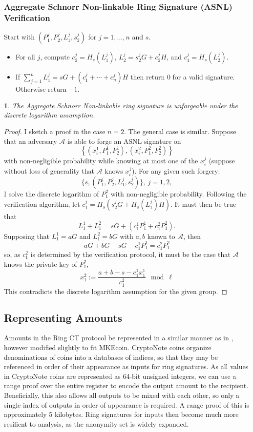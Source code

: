 \documentclass[12pt,oneside,english]{amsart}
\numberwithin{equation}{section}
\numberwithin{figure}{section}
\theoremstyle{plain}
\newtheorem{thm}{\protect\theoremname}
\theoremstyle{plain}
\theoremstyle{remark}
\theoremstyle{plain}
\theoremstyle{remark}
\theoremstyle{remark}
\theoremstyle{plain}
\theoremstyle{definition}
\providecommand{\theoremname}{Theorem}
\begin{document}
\subsubsection{ Aggregate Schnorr Non-linkable Ring Signature (ASNL) Verification}
Start with $(P_1^j, P_2^j, L_1^j, s_2^j)$ for $j=1,...,n$ and $s$. 
\begin{itemize}
 \item For all $j$, compute $c_2^j = H_s (L_1^j)$, $L_2^j = s_2^j G + c_2^j H$, and $c_1^j = H_s(L_2^j)$. 
 \item If $\sum_{j=1}^n L_1^j = s G + (c_1^j + \cdots + c_n^j) H$ then return $0$ for a valid signature.  Otherwise return $-1$. 
\end{itemize}
 \begin{thm}
 The Aggregate Schnorr Non-linkable ring signature is unforgeable under the discrete logarithm assumption.  
 \end{thm}
\begin{proof}
 I sketch a proof in the case $n=2$. The general case is similar. Suppose that an adversary $\mathcal{A}$ is able to forge an ASNL signature on 
\[
  \left\{ (x_i^1, P_1^1, P_2^1), (x_i^2, P_1^2, P_2^2) \right\}
 \]
 with non-negligible probability while knowing at most one of the $x_i^j$ (suppose without loss of generality that $\mathcal{A}$ knows $x_i^1$). For any given such forgery:
 \[
  \{s,(P_1^j, P_2^j, L_1^j, s_2^j)\},\ j=1,2,
 \]
I solve the discrete logarithm of $P_1^2$ with non-negligible probability. Following the verification algorithm, let $c_1^j = H_s\left(s_2^j G + H_s(L_1^j)H\right)$. It must then be true that 
\[
 L_1^1 + L_1^2 = sG + \left(c_1^1 P_1^1 + c_1^2 P_1^2\right).
\]
Supposing that $L_1^1 = a G$ and $L_1^2 = bG$ with $a,b$ known to $\mathcal{A}$, then 
\[ 
 aG + bG - sG - c_1^1 P_1^1 = c_1^2 P_1^2
\]
so, as $c_1^2$ is determined by the verification protocol, it must be the case that $\mathcal{A}$ knows the private key of $P_1^2$, 
\[
 x_1^2 := \frac{a+b-s-c_1^1 x_1^1}{c_1^2} \mod \ell
\]
 This contradicts the discrete logarithm assumption for the given group. 
\end{proof}
\subsection{Representing Amounts }
Amounts in the Ring CT protocol be represented in a similar manner as in \cite{GM}, however modified slightly to fit MKEcoin.
CryptoNote coins organize denominations of coins into a databases of indices, so that they may be referenced in order of their appearance as inputs for ring signatures. As all values in CryptoNote coins are represented as 64-bit unsigned integers, we can use a range proof over the entire register to encode the output amount to the recipient. Beneficially, this also allows all outputs to be mixed with each other, so only a single index of outputs in order of appearance is required. A range proof of this is approximately 5 kilobytes. Ring signatures for inputs then become much more resilient to analysis, as the anonymity set is widely expanded.
\end{document}
